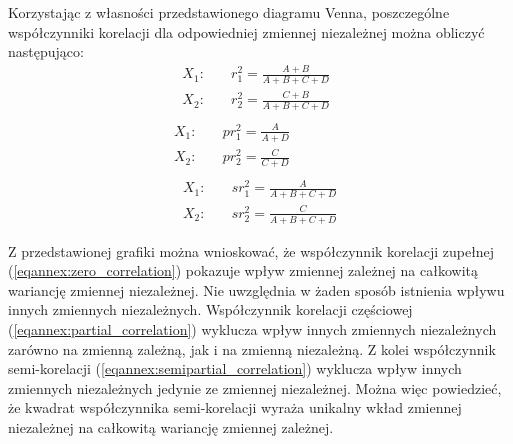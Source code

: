 \begin{appendices}
Korzystając z własności przedstawionego diagramu Venna, poszczególne współczynniki korelacji dla odpowiedniej zmiennej niezależnej można obliczyć następująco:
\begin{equation} \label{eqannex:zero_correlation}
	\begin{split}
		X_1:\quad& r_1^2 = \frac{A+B}{A+B+C+D} \phantom{\;\;}\\
		X_2:\quad& r_2^2 = \frac{C+B}{A+B+C+D} \\
	\end{split}
\end{equation}
\begin{equation} \label{eqannex:partial_correlation}
	\begin{split}
		X_1:\quad& pr_1^2 = \frac{A}{A+D} \phantom{\qquad\qquad}\\
		X_2:\quad& pr_2^2 = \frac{C}{C+D} \\
	\end{split}
\end{equation}
\begin{equation} \label{eqannex:semipartial_correlation}
	\begin{split}
		X_1:\quad& sr_1^2 = \frac{A}{A+B+C+D} \\
		X_2:\quad& sr_2^2 = \frac{C}{A+B+C+D} 
	\end{split}
\end{equation}

Z przedstawionej grafiki można wnioskować, że współczynnik korelacji zupełnej (\ref{eqannex:zero_correlation}) pokazuje wpływ zmiennej zależnej na całkowitą wariancję zmiennej niezależnej. Nie uwzględnia w żaden sposób istnienia wpływu innych zmiennych niezależnych. Współczynnik korelacji częściowej (\ref{eqannex:partial_correlation}) wyklucza wpływ innych zmiennych niezależnych zarówno na zmienną zależną, jak i na zmienną niezależną. Z kolei współczynnik semi-korelacji (\ref{eqannex:semipartial_correlation}) wyklucza wpływ innych zmiennych niezależnych jedynie ze zmiennej niezależnej. Można więc powiedzieć, że kwadrat współczynnika semi-korelacji wyraża unikalny wkład zmiennej niezależnej na całkowitą wariancję zmiennej zależnej.






\end{appendices}